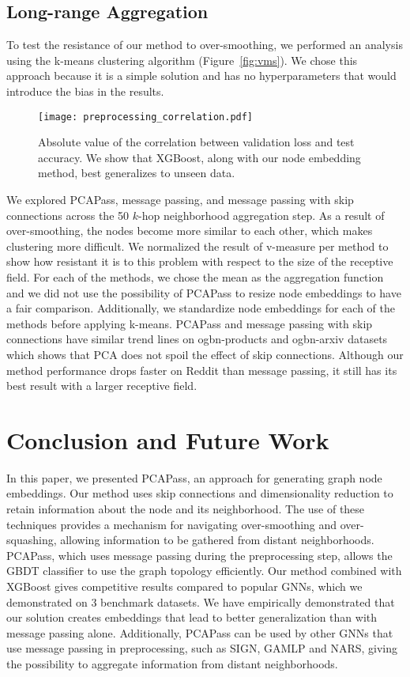 \documentclass[nohyperref]{article}
\theoremstyle{plain}
\theoremstyle{definition}
\theoremstyle{remark}
\begin{document}
\subsection{Long-range Aggregation}
To test the resistance of our method to over-smoothing, we performed an analysis using the k-means clustering algorithm (Figure~\ref{fig:vms}). We chose this approach because it is a simple solution and has no hyperparameters that would introduce the bias in the results.
\begin{figure}[H]
    \vskip 0.2in
    \begin{center}
    \centerline{\texttt{[image: preprocessing\_correlation.pdf]}}
    \caption{Absolute value of the correlation between validation loss and test accuracy. We show that XGBoost, along with our node embedding method, best generalizes to unseen data.}
    \label{fig:pcapass_corellation}
    \end{center}
    \vskip -0.2in
\end{figure}
We explored PCAPass, message passing, and message passing with skip connections across the 50 $k$-hop neighborhood aggregation step. 
As a result of over-smoothing, the nodes become more similar to each other, which makes clustering more difficult.
We normalized the result of v-measure per method to show how resistant it is to this problem with respect to the size of the receptive field.
For each of the methods, we chose the mean as the aggregation function and we did not use the possibility of PCAPass to resize node embeddings to have a fair comparison.
Additionally, we standardize node embeddings for each of the methods before applying k-means. PCAPass and message passing with skip connections have similar trend lines on ogbn-products and ogbn-arxiv datasets which shows that PCA does not spoil the effect of skip connections.
Although our method performance drops faster on Reddit than message passing, it still has its best result with a larger receptive field.

\section{Conclusion and Future Work}
In this paper, we presented PCAPass, an approach for generating graph node embeddings. Our method uses skip connections and dimensionality reduction to retain information about the node and its neighborhood. The use of these techniques provides a mechanism for navigating over-smoothing and over-squashing, allowing information to be gathered from distant neighborhoods. 
PCAPass, which uses message passing during the preprocessing step, allows the GBDT classifier to use the graph topology efficiently.
Our method combined with XGBoost gives competitive results compared to popular GNNs, which we demonstrated on 3 benchmark datasets. 
We have empirically demonstrated that our solution creates embeddings that lead to better generalization than with message passing alone.
Additionally, PCAPass can be used by other GNNs that use message passing in preprocessing, such as SIGN, GAMLP and NARS, giving the possibility to aggregate information from distant neighborhoods.
\end{document}
